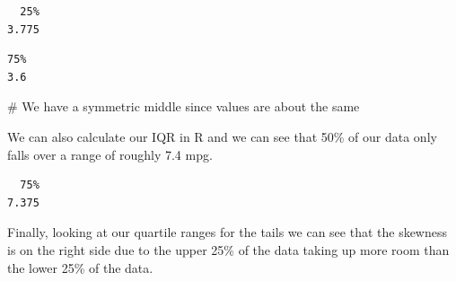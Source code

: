 \documentclass[
  letterpaper,
  DIV=11,
  numbers=noendperiod]{scrreprt}
\newenvironment{Shaded}{\begin{snugshade}}{\end{snugshade}}
\newcommand{\CommentTok}[1]{\textcolor[rgb]{0.37,0.37,0.37}{#1}}
\newcommand{\DecValTok}[1]{\textcolor[rgb]{0.68,0.00,0.00}{#1}}
\newcommand{\FunctionTok}[1]{\textcolor[rgb]{0.28,0.35,0.67}{#1}}
\newcommand{\NormalTok}[1]{\textcolor[rgb]{0.00,0.23,0.31}{#1}}
\newcommand{\SpecialCharTok}[1]{\textcolor[rgb]{0.37,0.37,0.37}{#1}}
\begin{document}
\begin{verbatim}
  25% 
3.775 
\end{verbatim}

\begin{Shaded}
\end{Shaded}

\begin{verbatim}
75% 
3.6 
\end{verbatim}

\begin{Shaded}
\begin{Highlighting}[]
\CommentTok{\# We have a symmetric middle since values are about the same}
\end{Highlighting}
\end{Shaded}

We can also calculate our IQR in R and we can see that 50\% of our data
only falls over a range of roughly 7.4 mpg.

\begin{Shaded}
\end{Shaded}

\begin{verbatim}
  75% 
7.375 
\end{verbatim}

Finally, looking at our quartile ranges for the tails we can see that
the skewness is on the right side due to the upper 25\% of the data
taking up more room than the lower 25\% of the data.

\begin{Shaded}
\end{Shaded}
\end{document}
